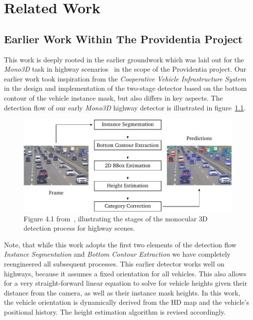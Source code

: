 
\chapter{Related Work}
\label{ch:related}

\section{Earlier Work Within The Providentia Project}
\label{sec:related-leon}

This work is deeply rooted in the earlier groundwork which was laid out for the \textit{Mono3D} task in highway scenarios~\cite{leonthesis} in the scope of the Providentia project.
Our earlier work took inspiration from the \textit{Cooperative Vehicle Infrastructure System}~\cite{guo2021detection} in the design and implementation of the two-stage detector based on the bottom contour of the vehicle instance mask, but also differs in key aspects.
The detection flow of our early \textit{Mono3D} highway detector is illustrated in figure~\ref{fig:related-leon}.

\begin{figure}[htb]
    \centering
    \includegraphics[width=0.9\linewidth]{figures/thesis_leon_fig_4_1}
    \caption{Figure 4.1 from~\cite{leonthesis}, illustrating the stages of the monocular 3D detection process for highway scenes.}
    \label{fig:related-leon}
\end{figure}

Note, that while this work adopts the first two elements of the detection flow \textemdash \textit{Instance Segmentation} and \textit{Bottom Contour Extraction} \textemdash we have completely reengineered all subsequent processes.
This earlier detector works well on highways, because it assumes a fixed orientation for all vehicles.
This also allows for a very straight-forward linear equation to solve for vehicle heights given their distance from the camera, as well as their instance mask heights.
In this work, the vehicle orientation is dynamically derived from the HD map and the vehicle's positional history.
The height estimation algorithm is revised accordingly.


